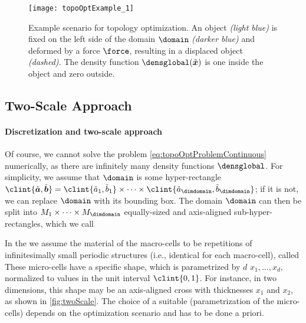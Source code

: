 \begin{SCfigure}
  \texttt{[image: topoOptExample\_1]}%
  \caption[%
    Example scenario for topology optimization%
  ]{%
    Example scenario for topology optimization.
    An object \emph{\textcolor{hellblau}{(light blue)}}
    is fixed on the left side
    of the domain $\domain$
    \emph{\textcolor{mittelblau!50}{(darker blue)}}
    and deformed by a force $\force$, resulting in a displaced object
    \emph{(dashed).}
    The density function $\densglobal(\tilde{\*x})$ is one inside the object
    and zero outside.%
  }%
  \label{fig:topoOptExample}%
\end{SCfigure}



\subsection{Two-Scale Approach}
\label{sec:612twoScale}

\paragraph{Discretization and two-scale approach}

Of course, we cannot solve the problem \eqref{eq:topoOptProblemContinuous}
numerically,
as there are infinitely many density functions $\densglobal$.
For simplicity, we assume that $\domain$ is some hyper-rectangle
$\clint{\tilde{\*a}, \tilde{\*b}}
= \clint{\tilde{a}_1, \tilde{b}_1} \times \dotsb \times
\clint{\tilde{a}_{\dimdomain}, \tilde{b}_{\dimdomain}}$;
if it is not, we can replace $\domain$ with its bounding box.
The domain $\domain$ can then be split into
$M_1 \times \dotsb \times M_{\dimdomain}$
equally-sized and axis-aligned sub-hyper-rectangles,
which we call 

In the 
we assume the material of the macro-cells to be
repetitions of infinitesimally small periodic structures
(i.e., identical for each macro-cell),
called 
These micro-cells have a specific shape, which is parametrized by
$d$  $x_1, \dotsc, x_d$,
normalized to values in the unit interval $\clint{0, 1}$.
For instance, in two dimensions,
this shape may be an axis-aligned cross
with thicknesses $x_1$ and $x_2$, as shown in \cref{fig:twoScale}.
The choice of a suitable 
(parametrization of the micro-cells)
depends on the optimization scenario and has to be done a priori.


